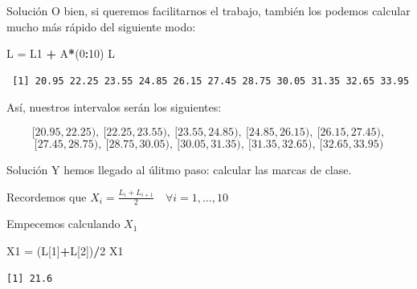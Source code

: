 \documentclass[
  ignorenonframetext,
  aspectratio=169]{beamer}
\newenvironment{Shaded}{\begin{snugshade}}{\end{snugshade}}
\newcommand{\DecValTok}[1]{\textcolor[rgb]{0.00,0.00,0.81}{#1}}
\newcommand{\NormalTok}[1]{#1}
\newcommand{\OtherTok}[1]{\textcolor[rgb]{0.56,0.35,0.01}{#1}}
\newcommand{\SpecialCharTok}[1]{\textcolor[rgb]{0.81,0.36,0.00}{\textbf{#1}}}
\begin{document}
\begin{frame}[fragile]{Solución}
\label{soluciuxf3n-7}
O bien, si queremos facilitarnos el trabajo, también los podemos
calcular mucho más rápido del siguiente modo:

\begin{Shaded}
\begin{Highlighting}[]
\NormalTok{L }\OtherTok{=}\NormalTok{ L1 }\SpecialCharTok{+}\NormalTok{ A}\SpecialCharTok{*}\NormalTok{(}\DecValTok{0}\SpecialCharTok{:}\DecValTok{10}\NormalTok{)}
\NormalTok{L}
\end{Highlighting}
\end{Shaded}

\begin{verbatim}
 [1] 20.95 22.25 23.55 24.85 26.15 27.45 28.75 30.05 31.35 32.65 33.95
\end{verbatim}

Así, nuestros intervalos serán los siguientes:

\[[20.95,22.25),\ [22.25,23.55),\ [23.55,24.85),\ [24.85,26.15),\ [26.15,27.45),\]
\[[27.45,28.75),\ [28.75,30.05),\ [30.05,31.35),\ [31.35,32.65),\ [32.65,33.95)\]
\end{frame}

\begin{frame}[fragile]{Solución}
\label{soluciuxf3n-8}
Y hemos llegado al úlitmo paso: calcular las marcas de clase.

Recordemos que
\(X_i = \frac{L_{i}+L_{i+1}}{2} \quad\forall i=1,\dots,10\)

Empecemos calculando \(X_1\)

\begin{Shaded}
\begin{Highlighting}[]
\NormalTok{X1 }\OtherTok{=}\NormalTok{ (L[}\DecValTok{1}\NormalTok{]}\SpecialCharTok{+}\NormalTok{L[}\DecValTok{2}\NormalTok{])}\SpecialCharTok{/}\DecValTok{2}
\NormalTok{X1}
\end{Highlighting}
\end{Shaded}

\begin{verbatim}
[1] 21.6
\end{verbatim}
\end{frame}
\end{document}
